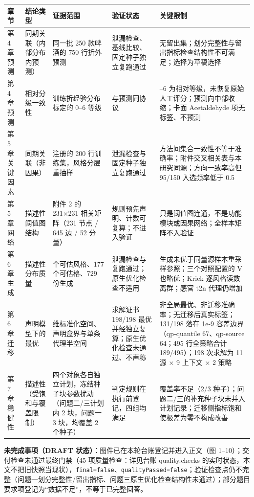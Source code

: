 \documentclass[11pt,a4paper]{article}
\begin{document}
{
\begin{longtable}[]{@{}
  >{\raggedright\arraybackslash}p{}
  >{\raggedright\arraybackslash}p{}
  >{\raggedright\arraybackslash}p{}
  >{\raggedright\arraybackslash}p{}
  >{\raggedright\arraybackslash}p{}@{}}
\toprule\noalign{}
\begin{minipage}[b]{\linewidth}\raggedright
章节
\end{minipage} & \begin{minipage}[b]{\linewidth}\raggedright
结论类型
\end{minipage} & \begin{minipage}[b]{\linewidth}\raggedright
证据范围
\end{minipage} & \begin{minipage}[b]{\linewidth}\raggedright
验证状态
\end{minipage} & \begin{minipage}[b]{\linewidth}\raggedright
关键限制
\end{minipage} \\
\midrule\noalign{}
\endhead
\bottomrule\noalign{}
\endlastfoot
第 4 章 预测 & 同期关联（内部分布内预测） & 同一批 250 款啤酒的 750
行折外预测 & 泄漏检查、基线比较、固定种子独立复跑通过 &
无留出集；划分完整性与留出指标检查结构性不可满足；选择为草稿选择 \\
第 4 章 预测 & 相对分级一致性 & 训练折经验分布标定的 0--6 等级 &
与预测同协议 & 0--6 为相对等级，未恢复原始人工评分；预测向中部收缩；卡面
Acetaldehyde 项无标签、不预测 \\
第 5 章 关键因素 & 同期关联（非因果） & 注册的 200
行训练集，风格分层重抽样 & 泄漏检查与固定种子独立复跑通过 &
方法间集合一致性不等于准确率；附件交叉相关表与本研究同源；方向一致率高但
95/150 入选频率低于 0.5 \\
第 5 章 网络 & 描述性阈值图结构 & 附件 2 的 231×231 相关矩阵（231 节点 /
645 边 / 52 分量） & 规则预先声明、计数可复算；不进入验证 &
只是阈值图连通，不是功能模块或因果网络；全样本矩阵不入验证 \\
第 6 章 生成 & 描述性分布质量 & 21 个可估风格、177 个可估格、729 份生成
& 泄漏检查与复跑通过；原生优化检查不适用 &
生成未优于同量源样本重采样参照；三个对照配置的 V 也略优；Kriek
逐风格读数离群；感官 t2n 代理仍增加 \\
第 6 章 迁移 & 声明模型下的最优 & 231
维标准化空间、声明盒界与单条代理半空间 & 求解证书 198/198
最优并经独立复算；原生优化检查未通过、不声称 &
非全局最优、非迁移准确率；无迁移后真实标签；131/198 落在 1e-9
容差边界（qp-quantile 67、qp-source 64；495 行全策略合计 189/495）；198
次求解为 11 源 × 9 上下文 × 2 策略 \\
第 7 章 稳健性 & 描述性（受饱和与覆盖限制） &
四个对象各自独立计划，冻结种子块参数扰动（问题二/三计划内 2 块，问题一 3
块，均覆盖 2 个种子） & 判定规则在执行前登记，四组均满足 &
覆盖率不足（2/3
种子）；问题二/三的补充种子块未并入计划记录；迁移侧指标饱和使极差为零不构成改善 \\
\end{longtable}
}

\textbf{未完成事项（DRAFT 状态）}：图件已在本轮台账登记并进入正文（图
1--10）；交付检查未通过最终门禁（45 项质量检查：详见台账 quality.checks
的实时状态，本文不把旧快照当现状），\texttt{final=false}、\texttt{qualityPassed=false}；验证检查点仍不完整（问题一划分完整性/留出指标、问题三原生优化检查结构性未通过）；部分题目要求项登记为``数据不足''，不等于已完整回答。
\end{document}
